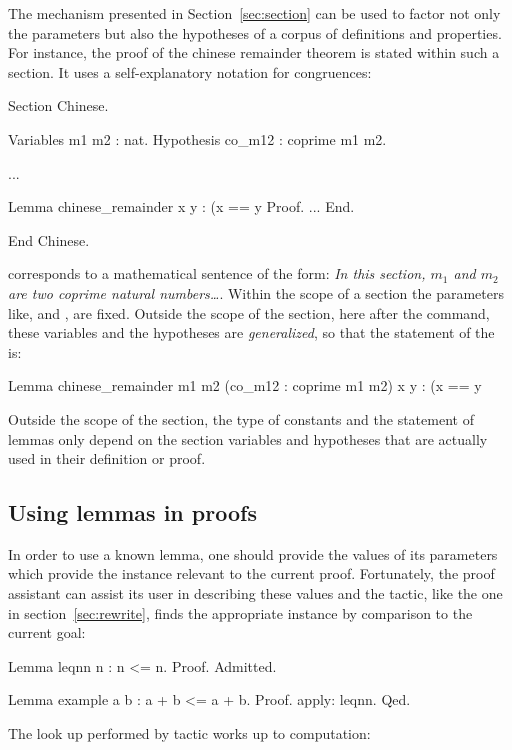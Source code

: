 The  mechanism presented in Section~\ref{sec:section} can
be used to factor not only the parameters but also the hypotheses of a
corpus of definitions and properties. For instance, the proof of the
chinese remainder theorem is stated within such a section. It uses a
self-explanatory notation for congruences:

\begin{coq}{}{}
Section Chinese.

Variables m1 m2 : nat.
Hypothesis co_m12 : coprime m1 m2.

...

Lemma chinese_remainder x y :
  (x == y %
Proof.
...
End.

End Chinese.
\end{coq}
corresponds to a mathematical sentence of the form: \emph{In this section,
  $m_1$ and $m_2$ are two coprime natural numbers\dots}. Within the
scope of a section the parameters like,  and , are
fixed. Outside the scope of the section, here after the
 command, these variables and the hypotheses are
\emph{generalized}, so that the statement of the  is:

\begin{coq}{}{}
Lemma chinese_remainder m1 m2 (co_m12 : coprime m1 m2) x y :
  (x == y %
\end{coq}

Outside the scope of the section, the type of constants and the
statement of lemmas only depend on the section variables and
hypotheses that are actually used in their definition or proof.



\subsection{Using lemmas in proofs}
\label{sec:quantifiedst}

In order to use a known lemma, one should provide the values of its
parameters which provide the instance relevant to the current
proof. Fortunately, the proof assistant can assist its user in
describing these values and the  tactic, like the
 one in section~\ref{sec:rewrite}, finds the appropriate
instance by comparison to the current goal:

\begin{coq}{}{}
Lemma leqnn n : n <= n. Proof. Admitted.

Lemma example a b : a + b <= a + b.
Proof. apply: leqnn. Qed.
\end{coq}
The look up performed by  tactic works up to computation:

